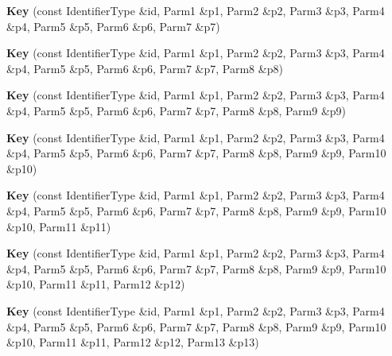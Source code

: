 \begin{DoxyCompactItemize}
\item 
\hypertarget{classLoki_1_1Key_a3ca5afe3fd1d42b8fcc0efa9a911460d}{}{\bfseries Key} (const Identifier\+Type \&id, Parm1 \&p1, Parm2 \&p2, Parm3 \&p3, Parm4 \&p4, Parm5 \&p5, Parm6 \&p6, Parm7 \&p7)\label{classLoki_1_1Key_a3ca5afe3fd1d42b8fcc0efa9a911460d}

\item 
\hypertarget{classLoki_1_1Key_a3909c54049c702fffad5fa0fa23d36cd}{}{\bfseries Key} (const Identifier\+Type \&id, Parm1 \&p1, Parm2 \&p2, Parm3 \&p3, Parm4 \&p4, Parm5 \&p5, Parm6 \&p6, Parm7 \&p7, Parm8 \&p8)\label{classLoki_1_1Key_a3909c54049c702fffad5fa0fa23d36cd}

\item 
\hypertarget{classLoki_1_1Key_a47632ab86532fd15b9df5b3791159e91}{}{\bfseries Key} (const Identifier\+Type \&id, Parm1 \&p1, Parm2 \&p2, Parm3 \&p3, Parm4 \&p4, Parm5 \&p5, Parm6 \&p6, Parm7 \&p7, Parm8 \&p8, Parm9 \&p9)\label{classLoki_1_1Key_a47632ab86532fd15b9df5b3791159e91}

\item 
\hypertarget{classLoki_1_1Key_a6bdc37ba0a049f3000fb27b79c900877}{}{\bfseries Key} (const Identifier\+Type \&id, Parm1 \&p1, Parm2 \&p2, Parm3 \&p3, Parm4 \&p4, Parm5 \&p5, Parm6 \&p6, Parm7 \&p7, Parm8 \&p8, Parm9 \&p9, Parm10 \&p10)\label{classLoki_1_1Key_a6bdc37ba0a049f3000fb27b79c900877}

\item 
\hypertarget{classLoki_1_1Key_a7310218bd2f58ff9e0da18bb8c2ae35e}{}{\bfseries Key} (const Identifier\+Type \&id, Parm1 \&p1, Parm2 \&p2, Parm3 \&p3, Parm4 \&p4, Parm5 \&p5, Parm6 \&p6, Parm7 \&p7, Parm8 \&p8, Parm9 \&p9, Parm10 \&p10, Parm11 \&p11)\label{classLoki_1_1Key_a7310218bd2f58ff9e0da18bb8c2ae35e}

\item 
\hypertarget{classLoki_1_1Key_a1d4301ce1a056877ef5bfb444a887bdb}{}{\bfseries Key} (const Identifier\+Type \&id, Parm1 \&p1, Parm2 \&p2, Parm3 \&p3, Parm4 \&p4, Parm5 \&p5, Parm6 \&p6, Parm7 \&p7, Parm8 \&p8, Parm9 \&p9, Parm10 \&p10, Parm11 \&p11, Parm12 \&p12)\label{classLoki_1_1Key_a1d4301ce1a056877ef5bfb444a887bdb}

\item 
\hypertarget{classLoki_1_1Key_a5b7548a6488b2e339fa597425641aee5}{}{\bfseries Key} (const Identifier\+Type \&id, Parm1 \&p1, Parm2 \&p2, Parm3 \&p3, Parm4 \&p4, Parm5 \&p5, Parm6 \&p6, Parm7 \&p7, Parm8 \&p8, Parm9 \&p9, Parm10 \&p10, Parm11 \&p11, Parm12 \&p12, Parm13 \&p13)\label{classLoki_1_1Key_a5b7548a6488b2e339fa597425641aee5}


\end{DoxyCompactItemize}
